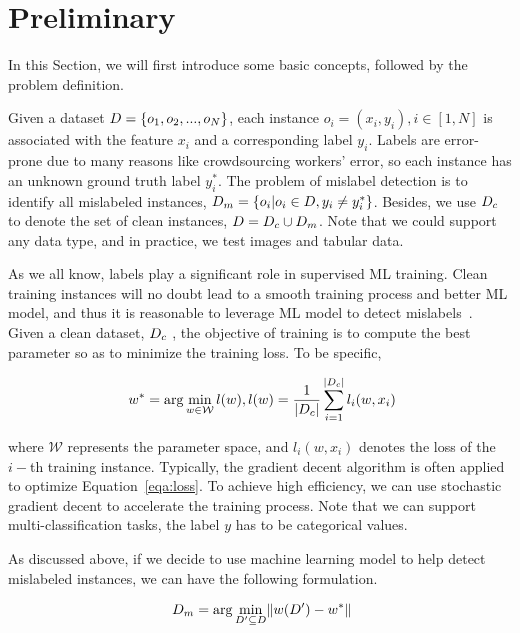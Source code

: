 \section{Preliminary} 
\label{sec:pre}

In this Section, we will first introduce some basic concepts, followed by  the problem definition.

 Given a dataset $D=\{o_1, o_2, ..., o_N\}$, each instance  $o_i = (x_i, y_i), i\in [1,N]$ is associated with the feature $x_i$ and a corresponding label $y_i$. Labels are error-prone due to many reasons like crowdsourcing workers' error, so each instance has an unknown ground truth label $y_i^*$. The problem of mislabel detection is to identify all mislabeled instances, \ie $D_m = \{o_i|o_i\in D, y_i \neq y_i^*\}$. Besides, we use $D_c$ to denote the set of clean instances, \ie $D = D_c \cup D_m$.
Note that  we could  support any data type, and in practice, we test images and tabular data.

 As we all know, labels play a significant role in supervised ML training.
Clean training instances will no doubt lead to a smooth training process and better ML model, and thus it is reasonable to leverage ML model to detect mislabels~\cite{}. Given a clean dataset, \eg  $D_c$ , the objective of training  is to compute the best parameter so as to minimize the training loss. To be specific, 

\begin{equation}~\label{eqa:loss}
	w^* = \arg\min\limits_{w\in \mathcal{W}} l(w), l(w)= \frac{1}{|D_c|}\sum_{i=1}^{|D_c|} l_i(w, x_i)
\end{equation}

\noindent where $\mathcal{W}$ represents the parameter space, and $l_i(w, x_i)$ denotes the loss of the $i-$th training instance. Typically, the gradient decent algorithm is often applied to optimize Equation~\ref{eqa:loss}. To achieve high efficiency, we can use stochastic gradient decent to accelerate the training process. Note that we can support multi-classification tasks, \ie the label $y$ has to be categorical values.



 As discussed above, if we decide to use machine learning model to help detect mislabeled instances, we can have the following formulation.

\begin{equation}~\label{eqa:optimize}
D_m = \arg\min\limits_{D'\subseteq D} \rVert w(D')-w^* \lVert
\end{equation}

